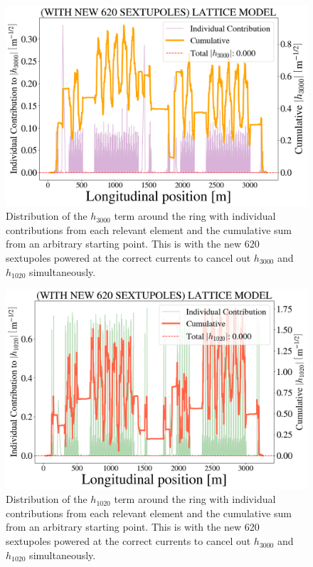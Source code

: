 \begin{figure}[H]
    \centering
    \includegraphics[width=\columnwidth]{chapter4/new_sexts_h3000.png}
    \caption{Distribution of the $h_{3000}$ term around the ring with individual contributions from each relevant element and the cumulative sum from an arbitrary starting point. This is with the new 620 sextupoles powered at the correct currents to cancel out $h_{3000}$ and $h_{1020}$ simultaneously.}
    \label{fig:h3000newsexts}
\end{figure}

\begin{figure}[H]
    \centering
    \includegraphics[width=\columnwidth]{chapter4/new_sexts_h1020.png}
    \caption{Distribution of the $h_{1020}$ term around the ring with individual contributions from each relevant element and the cumulative sum from an arbitrary starting point. This is with the new 620 sextupoles powered at the correct currents to cancel out $h_{3000}$ and $h_{1020}$ simultaneously.}
    \label{fig:h1020newsexts}
\end{figure}
